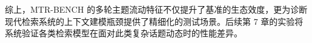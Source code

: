 综上，MTR-BENCH 的多轮主题流动特征不仅提升了基准的生态效度，更为诊断现代检索系统的上下文建模瓶颈提供了精细化的测试场景。后续第 7 章的实验将系统验证各类检索模型在面对此类复杂话题动态时的性能差异。












